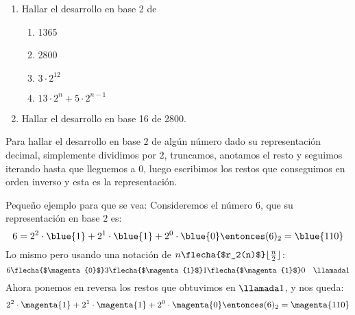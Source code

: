 \begin{enunciado}{\ejercicio}
  \begin{enumerate}[label=(\alph*)]
    \item Hallar el desarrollo en base 2 de
          \begin{multicols}{4}
            \begin{enumerate}[label=\roman*.]
              \item 1365
              \item 2800
              \item $3\cdot 2^{12}$
              \item $13 \cdot 2^n + 5 \cdot 2^{n-1}$
            \end{enumerate}
          \end{multicols}

    \item Hallar el desarrollo en base 16 de 2800.
  \end{enumerate}
\end{enunciado}
{
\footnotesize
{}
}

Para hallar el desarrollo en base $2$ de algún número dado su representación decimal, simplemente dividimos por $2$, truncamos, anotamos el resto
y seguimos iterando hasta que lleguemos a $0$, luego escribimos los restos que conseguimos en orden inverso y esta es la representación.

\medskip

Pequeño ejemplo para que se vea: Consideremos el número $6$, que su representación en base $2$ es:
$$
  6 = 2^2 \cdot \blue{1} + 2^1 \cdot \blue{1} + 2^0 \cdot \blue{0}
  \entonces
  (6)_2 =  \blue{110}
$$
Lo mismo pero usando una notación de $n \flecha{$r_2(n)$} \lfloor \frac{n}{2} \rfloor$:
$$
  6 \flecha{$\magenta{0}$} 3 \flecha{$\magenta{1}$} 1 \flecha{$\magenta{1}$} 0 \quad \llamada1
$$
Ahora ponemos en reversa los restos que obtuvimos en $\llamada1$, y nos queda:
$$
  2^2 \cdot \magenta{1} + 2^1 \cdot \magenta{1} + 2^0 \cdot \magenta{0}
  \entonces
  (6)_2 =  \magenta{110}
$$

